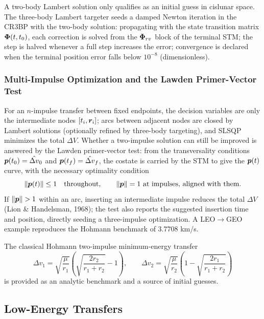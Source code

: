 A two-body Lambert solution only qualifies as an initial guess in cislunar
space. The three-body Lambert targeter seeds a damped Newton iteration in the
CR3BP with the two-body solution: propagating with the state transition
matrix $\bm{\Phi}(t, t_0)$, each correction is solved from the $\bm{\Phi}_{rv}$ block
of the terminal STM; the step is halved whenever a full step increases the
error; convergence is declared when the terminal position error falls below
$10^{-8}$ (dimensionless).

\subsubsection{Multi-Impulse Optimization and the Lawden Primer-Vector Test}

For an $n$-impulse transfer between fixed endpoints, the decision variables
are only the intermediate nodes $[t_i, \bm{r}_i]$; arcs between adjacent
nodes are closed by Lambert solutions (optionally refined by three-body
targeting), and SLSQP minimizes the total $\Delta V$. Whether a two-impulse
solution can still be improved is answered by the Lawden primer-vector test:
from the transversality conditions $\bm{p}(t_0) = \hat{\Delta v}_0$ and
$\bm{p}(t_f) = \hat{\Delta v}_f$, the costate is carried by the STM to give
the $\bm{p}(t)$ curve, with the necessary optimality condition
\begin{equation}
  \left\lVert \bm{p}(t) \right\rVert \le 1 \quad \text{throughout},
  \qquad \left\lVert \bm{p} \right\rVert = 1 \text{ at impulses, aligned with them}.
\end{equation}
If $\left\lVert \bm{p} \right\rVert > 1$ within an arc, inserting an intermediate impulse
reduces the total $\Delta V$ (Lion \& Handelsman, 1968); the test also
reports the suggested insertion time and position, directly seeding a
three-impulse optimization. A LEO$\to$GEO example reproduces the Hohmann
benchmark of $3.7708$ km/s.

The classical Hohmann two-impulse minimum-energy transfer
\begin{equation}
  \Delta v_1 = \sqrt{\frac{\mu}{r_1}}\left(\sqrt{\frac{2 r_2}{r_1+r_2}} - 1\right),
  \qquad
  \Delta v_2 = \sqrt{\frac{\mu}{r_2}}\left(1 - \sqrt{\frac{2 r_1}{r_1+r_2}}\right)
\end{equation}
is provided as an analytic benchmark and a source of initial guesses.

\subsection{Low-Energy Transfers}

